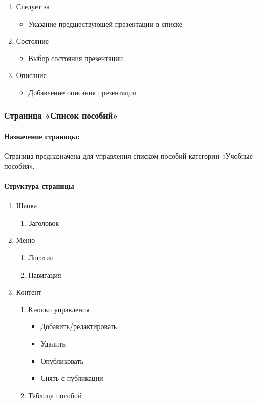\begin{enumerate}
\begin{enumerate}
\begin{enumerate}
			\item Следует за
			\begin{itemize}
				\item Указание предшествующей презентации в списке 
			\end{itemize}

			\item Состояние
			\begin{itemize}
				\item Выбор состояния презентации
			\end{itemize}

			\item Описание
			\begin{itemize}
				\item Добавление описания презентации
			\end{itemize}


		\end{enumerate}
	\end{enumerate}
\end{enumerate}


\subsubsection{Страница «Список пособий»}
\paragraph{Назначение страницы:} Страница предназначена для управления списком пособий категории «Учебные пособия».

\paragraph{Структура страницы}
\begin{enumerate}
	\item Шапка
	\begin{enumerate}
		\item Заголовок
	\end{enumerate}

	\item Меню
	\begin{enumerate}
		\item Логотип
		\item Навигация
	\end{enumerate}

	\item Контент
	\begin{enumerate}
		\item Кнопки управления
		\begin{itemize}
			\item Добавить/редактировать
			\item Удалить
			\item Опубликовать
			\item Снять с публикации
		\end{itemize}
		\item Таблица пособий
	\end{enumerate}
\end{enumerate}

